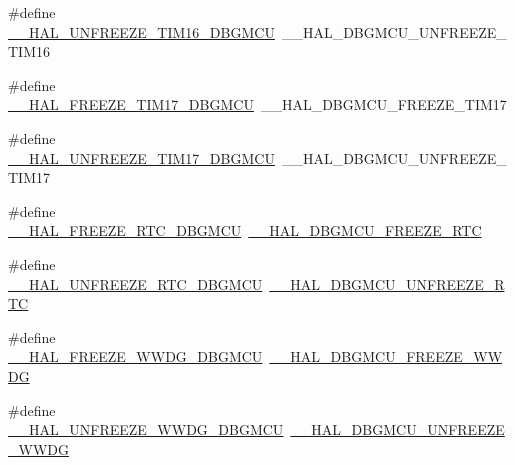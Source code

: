 \begin{DoxyCompactItemize}
\item 
\#define \hyperlink{group___h_a_l___d_b_g_m_c_u___aliased___macros_ga10b34e377b65a92c0d50ad6909abd9d8}{\+\_\+\+\_\+\+H\+A\+L\+\_\+\+U\+N\+F\+R\+E\+E\+Z\+E\+\_\+\+T\+I\+M16\+\_\+\+D\+B\+G\+M\+CU}~\+\_\+\+\_\+\+H\+A\+L\+\_\+\+D\+B\+G\+M\+C\+U\+\_\+\+U\+N\+F\+R\+E\+E\+Z\+E\+\_\+\+T\+I\+M16
\item 
\#define \hyperlink{group___h_a_l___d_b_g_m_c_u___aliased___macros_ga65b166b61431e09484788066a14f5ed9}{\+\_\+\+\_\+\+H\+A\+L\+\_\+\+F\+R\+E\+E\+Z\+E\+\_\+\+T\+I\+M17\+\_\+\+D\+B\+G\+M\+CU}~\+\_\+\+\_\+\+H\+A\+L\+\_\+\+D\+B\+G\+M\+C\+U\+\_\+\+F\+R\+E\+E\+Z\+E\+\_\+\+T\+I\+M17
\item 
\#define \hyperlink{group___h_a_l___d_b_g_m_c_u___aliased___macros_ga8917b91d64c02daa61bfd4e80c920ea3}{\+\_\+\+\_\+\+H\+A\+L\+\_\+\+U\+N\+F\+R\+E\+E\+Z\+E\+\_\+\+T\+I\+M17\+\_\+\+D\+B\+G\+M\+CU}~\+\_\+\+\_\+\+H\+A\+L\+\_\+\+D\+B\+G\+M\+C\+U\+\_\+\+U\+N\+F\+R\+E\+E\+Z\+E\+\_\+\+T\+I\+M17
\item 
\#define \hyperlink{group___h_a_l___d_b_g_m_c_u___aliased___macros_ga5cde9c9073ca8e95a084d62aac0931ef}{\+\_\+\+\_\+\+H\+A\+L\+\_\+\+F\+R\+E\+E\+Z\+E\+\_\+\+R\+T\+C\+\_\+\+D\+B\+G\+M\+CU}~\hyperlink{group___h_a_l___exported___macros_ga6ea586c594feb6eb0f2aba52f1c69f4c}{\+\_\+\+\_\+\+H\+A\+L\+\_\+\+D\+B\+G\+M\+C\+U\+\_\+\+F\+R\+E\+E\+Z\+E\+\_\+\+R\+TC}
\item 
\#define \hyperlink{group___h_a_l___d_b_g_m_c_u___aliased___macros_ga95995ebdcbfbdc73e7d53d0d2ae2724e}{\+\_\+\+\_\+\+H\+A\+L\+\_\+\+U\+N\+F\+R\+E\+E\+Z\+E\+\_\+\+R\+T\+C\+\_\+\+D\+B\+G\+M\+CU}~\hyperlink{group___h_a_l___exported___macros_ga3d85d5cda1979c7df426634a1d3d7d35}{\+\_\+\+\_\+\+H\+A\+L\+\_\+\+D\+B\+G\+M\+C\+U\+\_\+\+U\+N\+F\+R\+E\+E\+Z\+E\+\_\+\+R\+TC}
\item 
\#define \hyperlink{group___h_a_l___d_b_g_m_c_u___aliased___macros_ga731d1c183c8d3876895d80f0ba348616}{\+\_\+\+\_\+\+H\+A\+L\+\_\+\+F\+R\+E\+E\+Z\+E\+\_\+\+W\+W\+D\+G\+\_\+\+D\+B\+G\+M\+CU}~\hyperlink{group___h_a_l___exported___macros_ga81215154725c479c67fb1adac906fbd9}{\+\_\+\+\_\+\+H\+A\+L\+\_\+\+D\+B\+G\+M\+C\+U\+\_\+\+F\+R\+E\+E\+Z\+E\+\_\+\+W\+W\+DG}
\item 
\#define \hyperlink{group___h_a_l___d_b_g_m_c_u___aliased___macros_gab0af7647542a9615339bd1b0b1fc4c27}{\+\_\+\+\_\+\+H\+A\+L\+\_\+\+U\+N\+F\+R\+E\+E\+Z\+E\+\_\+\+W\+W\+D\+G\+\_\+\+D\+B\+G\+M\+CU}~\hyperlink{group___h_a_l___exported___macros_gaa14c8a2e8911976b8c8ce6ca278372a2}{\+\_\+\+\_\+\+H\+A\+L\+\_\+\+D\+B\+G\+M\+C\+U\+\_\+\+U\+N\+F\+R\+E\+E\+Z\+E\+\_\+\+W\+W\+DG}

\end{DoxyCompactItemize}
